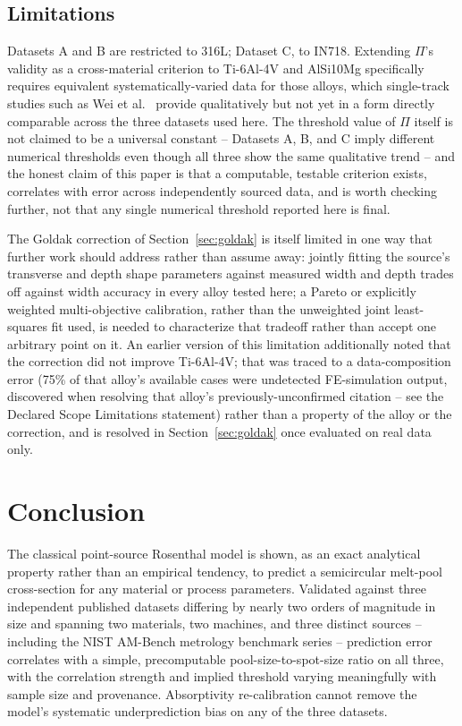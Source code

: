 \documentclass[12pt]{article}
\begin{document}
\subsection{Limitations}
\label{sec:limitations}
Datasets A and B are restricted to 316L; Dataset C, to IN718. Extending $\Pi$'s validity as a cross-material criterion to Ti-6Al-4V and AlSi10Mg specifically requires equivalent systematically-varied data for those alloys, which single-track studies such as Wei et al.\ \cite{wei2017} provide qualitatively but not yet in a form directly comparable across the three datasets used here. The threshold value of $\Pi$ itself is not claimed to be a universal constant -- Datasets A, B, and C imply different numerical thresholds even though all three show the same qualitative trend -- and the honest claim of this paper is that a computable, testable criterion exists, correlates with error across independently sourced data, and is worth checking further, not that any single numerical threshold reported here is final.

The Goldak correction of Section~\ref{sec:goldak} is itself limited in one way that further work should address rather than assume away: jointly fitting the source's transverse and depth shape parameters against measured width and depth trades off against width accuracy in every alloy tested here; a Pareto or explicitly weighted multi-objective calibration, rather than the unweighted joint least-squares fit used, is needed to characterize that tradeoff rather than accept one arbitrary point on it. An earlier version of this limitation additionally noted that the correction did not improve Ti-6Al-4V; that was traced to a data-composition error (75\% of that alloy's available cases were undetected FE-simulation output, discovered when resolving that alloy's previously-unconfirmed citation -- see the Declared Scope Limitations statement) rather than a property of the alloy or the correction, and is resolved in Section~\ref{sec:goldak} once evaluated on real data only.

\section{Conclusion}

The classical point-source Rosenthal model is shown, as an exact analytical property rather than an empirical tendency, to predict a semicircular melt-pool cross-section for any material or process parameters. Validated against three independent published datasets differing by nearly two orders of magnitude in size and spanning two materials, two machines, and three distinct sources -- including the NIST AM-Bench metrology benchmark series -- prediction error correlates with a simple, precomputable pool-size-to-spot-size ratio on all three, with the correlation strength and implied threshold varying meaningfully with sample size and provenance. Absorptivity re-calibration cannot remove the model's systematic underprediction bias on any of the three datasets.
\end{document}
